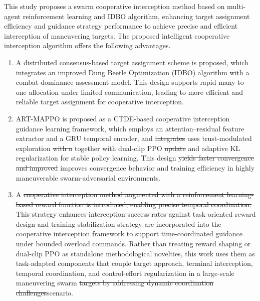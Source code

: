 \documentclass[lettersize,journal]{IEEEtran}
\providecommand{\DIFadd}[1]{{\protect\color{blue}#1}} %
\providecommand{\DIFdel}[1]{{\protect\color{red}\sout{#1}}}                      %
\providecommand{\DIFaddbegin}{} %
\providecommand{\DIFaddend}{} %
\providecommand{\DIFdelbegin}{} %
\providecommand{\DIFdelend}{} %
\newcommand{\DIFscaledelfig}{0.5}
\newlength{\DIFdelgraphicswidth} %
\newlength{\DIFdelgraphicsheight} %
\newcommand{\DIFaddincludegraphics}[2][]{{\color{blue}\fbox{\DIFOincludegraphics[#1]{#2}}}} %
\newcommand{\DIFdelincludegraphics}[2][]{%
\sbox{\DIFdelgraphicsbox}{\DIFOincludegraphics[#1]{#2}}%
\settoboxwidth{\DIFdelgraphicswidth}{\DIFdelgraphicsbox} %
\settoboxtotalheight{\DIFdelgraphicsheight}{\DIFdelgraphicsbox} %
\scalebox{\DIFscaledelfig}{%
\parbox[b]{\DIFdelgraphicswidth}{\usebox{\DIFdelgraphicsbox}\\[-\baselineskip] \rule{\DIFdelgraphicswidth}{0em}}\llap{\resizebox{\DIFdelgraphicswidth}{\DIFdelgraphicsheight}{%
\setlength{\unitlength}{\DIFdelgraphicswidth}%
\begin{picture}(1,1)%
\thicklines\linethickness{2pt} %
{\color[rgb]{1,0,0}\put(0,0){\framebox(1,1){}}}%
{\color[rgb]{1,0,0}\put(0,0){\line( 1,1){1}}}%
{\color[rgb]{1,0,0}\put(0,1){\line(1,-1){1}}}%
\end{picture}%
}\hspace*{3pt}}} %
} %
\DeclareRobustCommand{\DIFaddbegin}{\DIFOaddbegin \let\includegraphics\DIFaddincludegraphics} %
\DeclareRobustCommand{\DIFaddend}{\DIFOaddend \let\includegraphics\DIFOincludegraphics} %
\DeclareRobustCommand{\DIFdelbegin}{\DIFOdelbegin \let\includegraphics\DIFdelincludegraphics} %
\DeclareRobustCommand{\DIFdelend}{\DIFOaddend \let\includegraphics\DIFOincludegraphics} %
\begin{document}
This study proposes a swarm cooperative interception method based on multi-agent reinforcement
learning and IDBO algorithm, enhancing target assignment efficiency and guidance strategy
performance to achieve precise and efficient interception of maneuvering targets.
The proposed intelligent cooperative interception algorithm offers the following advantages.

\begin{enumerate}
\item A distributed consensus-based target assignment scheme is proposed, which integrates an
improved Dung Beetle Optimization (IDBO) algorithm with a combat-dominance assessment model.
This design supports rapid many-to-one allocation under limited communication, leading to more
efficient and reliable target assignment for cooperative interception.

\item ART-MAPPO is proposed as a CTDE-based cooperative interception guidance learning
framework, which employs an attention--residual feature extractor and a GRU temporal encoder,
and \DIFdelbegin \DIFdel{integrates }\DIFdelend \DIFaddbegin \DIFadd{uses }\DIFaddend trust-modulated exploration \DIFdelbegin \DIFdel{with a }\DIFdelend \DIFaddbegin \DIFadd{together with }\DIFaddend dual-clip PPO \DIFdelbegin \DIFdel{update }\DIFdelend and adaptive KL
regularization \DIFaddbegin \DIFadd{for stable policy learning}\DIFaddend . This design \DIFdelbegin \DIFdel{yields faster convergence and improved }\DIFdelend \DIFaddbegin \DIFadd{improves convergence behavior and
}\DIFaddend training efficiency in highly maneuverable swarm-adversarial environments.

\item A \DIFdelbegin \DIFdel{cooperative interception method augmented with a reinforcement learning-based reward function is introduced, enabling precise temporal coordination. This strategy enhances
interception success rates against }\DIFdelend \DIFaddbegin \DIFadd{task-oriented reward design and training stabilization strategy are incorporated into
the cooperative interception framework to support time-coordinated guidance under bounded
overload commands. Rather than treating reward shaping or dual-clip PPO as standalone
methodological novelties, this work uses them as task-adapted components that couple target
approach, terminal interception, temporal coordination, and control-effort regularization in a
}\DIFaddend large-scale maneuvering swarm \DIFdelbegin \DIFdel{targets by addressing dynamic
coordination challenges}\DIFdelend \DIFaddbegin \DIFadd{scenario}\DIFaddend .
\end{enumerate}
\end{document}
